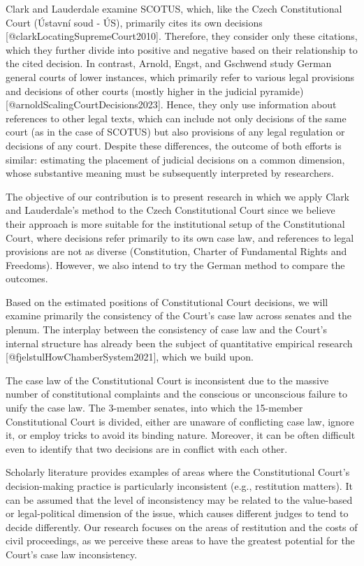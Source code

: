 \documentclass[
]{article}
\begin{document}
Clark and Lauderdale examine SCOTUS, which, like the Czech
Constitutional Court (Ústavní soud - ÚS), primarily cites its own
decisions {[}@clarkLocatingSupremeCourt2010{]}. Therefore, they consider
only these citations, which they further divide into positive and
negative based on their relationship to the cited decision. In contrast,
Arnold, Engst, and Gschwend study German general courts of lower
instances, which primarily refer to various legal provisions and
decisions of other courts (mostly higher in the judicial pyramide)
{[}@arnoldScalingCourtDecisions2023{]}. Hence, they only use information
about references to other legal texts, which can include not only
decisions of the same court (as in the case of SCOTUS) but also
provisions of any legal regulation or decisions of any court. Despite
these differences, the outcome of both efforts is similar: estimating
the placement of judicial decisions on a common dimension, whose
substantive meaning must be subsequently interpreted by researchers.

The objective of our contribution is to present research in which we
apply Clark and Lauderdale's method to the Czech Constitutional Court
since we believe their approach is more suitable for the institutional
setup of the Constitutional Court, where decisions refer primarily to
its own case law, and references to legal provisions are not as diverse
(Constitution, Charter of Fundamental Rights and Freedoms). However, we
also intend to try the German method to compare the outcomes.

Based on the estimated positions of Constitutional Court decisions, we
will examine primarily the consistency of the Court's case law across
senates and the plenum. The interplay between the consistency of case
law and the Court's internal structure has already been the subject of
quantitative empirical research {[}@fjelstulHowChamberSystem2021{]},
which we build upon.

The case law of the Constitutional Court is inconsistent due to the
massive number of constitutional complaints and the conscious or
unconscious failure to unify the case law. The 3-member senates, into
which the 15-member Constitutional Court is divided, either are unaware
of conflicting case law, ignore it, or employ tricks to avoid its
binding nature. Moreover, it can be often difficult even to identify
that two decisions are in conflict with each other.

Scholarly literature provides examples of areas where the Constitutional
Court's decision-making practice is particularly inconsistent (e.g.,
restitution matters). It can be assumed that the level of inconsistency
may be related to the value-based or legal-political dimension of the
issue, which causes different judges to tend to decide differently. Our
research focuses on the areas of restitution and the costs of civil
proceedings, as we perceive these areas to have the greatest potential
for the Court's case law inconsistency.
\end{document}
